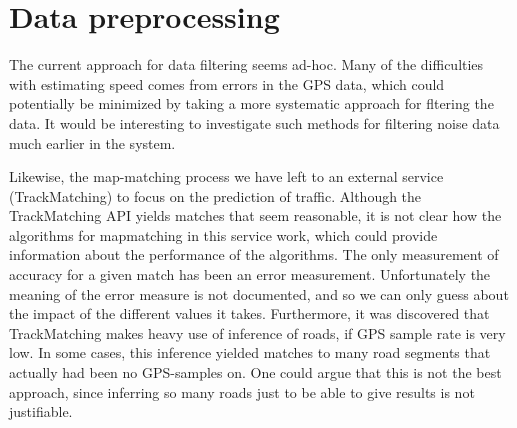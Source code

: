 

\section{Data preprocessing}
The current approach for data filtering seems ad-hoc. Many of the difficulties with estimating speed comes from errors in the GPS data, which could potentially be minimized by taking a more systematic approach for fltering the data. It would be interesting to investigate such methods for filtering noise data much earlier in the system.

Likewise, the map-matching process we have left to an external service (TrackMatching) to focus on the prediction of traffic. Although the TrackMatching API yields matches that seem reasonable, it is not clear how the algorithms for mapmatching in this service work, which could provide information about the performance of the algorithms. The only measurement of accuracy for a given match has been an error measurement. Unfortunately the meaning of the error measure is not documented, and so we can only guess about the impact of the different values it takes. Furthermore, it was discovered that TrackMatching makes heavy use of inference of roads, if GPS sample rate is very low. In some cases, this inference yielded matches to many road segments that actually had been no GPS-samples on. One could argue that this is not the best approach, since inferring so many roads just to be able to give results is not justifiable.

